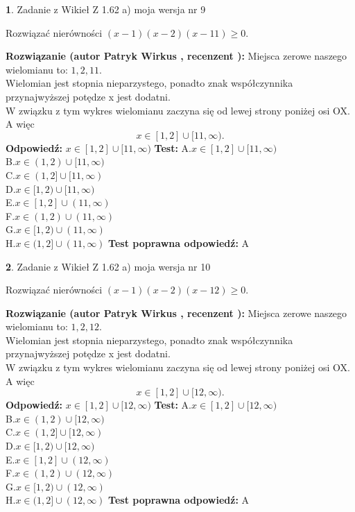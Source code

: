 \documentclass[12pt, a4paper]{article}
\theoremstyle{definition} %
\newtheorem{zad}{}
\newcommand{\zadStart}[1]{\begin{zad}#1\newline}
\newcommand{\zadStop}{\end{zad}}
\newcommand{\rozwStart}[2]{\noindent \textbf{Rozwiązanie (autor #1 , recenzent #2): }\newline}
\newcommand{\rozwStop}{\newline}
\newcommand{\odpStart}{\noindent \textbf{Odpowiedź:}\newline}
\newcommand{\odpStop}{\newline}
\newcommand{\testStart}{\noindent \textbf{Test:}\newline}
\newcommand{\testStop}{\newline}
\newcommand{\kluczStart}{\noindent \textbf{Test poprawna odpowiedź:}\newline}
\newcommand{\kluczStop}{\newline}
\begin{document}
\zadStart{Zadanie z Wikieł Z 1.62 a) moja wersja nr 9}

Rozwiązać nierówności $(x-1)(x-2)(x-11)\ge0$.
\zadStop
\rozwStart{Patryk Wirkus}{}
Miejsca zerowe naszego wielomianu to: $1, 2, 11$.\\
Wielomian jest stopnia nieparzystego, ponadto znak współczynnika przy\linebreak najwyższej potędze x jest dodatni.\\ W związku z tym wykres wielomianu zaczyna się od lewej strony poniżej osi OX. A więc $$x \in [1,2] \cup [11,\infty).$$
\rozwStop
\odpStart
$x \in [1,2] \cup [11,\infty)$
\odpStop
\testStart
A.$x \in [1,2] \cup [11,\infty)$\\
B.$x \in (1,2) \cup [11,\infty)$\\
C.$x \in (1,2] \cup [11,\infty)$\\
D.$x \in [1,2) \cup [11,\infty)$\\
E.$x \in [1,2] \cup (11,\infty)$\\
F.$x \in (1,2) \cup (11,\infty)$\\
G.$x \in [1,2) \cup (11,\infty)$\\
H.$x \in (1,2] \cup (11,\infty)$
\testStop
\kluczStart
A
\kluczStop



\zadStart{Zadanie z Wikieł Z 1.62 a) moja wersja nr 10}

Rozwiązać nierówności $(x-1)(x-2)(x-12)\ge0$.
\zadStop
\rozwStart{Patryk Wirkus}{}
Miejsca zerowe naszego wielomianu to: $1, 2, 12$.\\
Wielomian jest stopnia nieparzystego, ponadto znak współczynnika przy\linebreak najwyższej potędze x jest dodatni.\\ W związku z tym wykres wielomianu zaczyna się od lewej strony poniżej osi OX. A więc $$x \in [1,2] \cup [12,\infty).$$
\rozwStop
\odpStart
$x \in [1,2] \cup [12,\infty)$
\odpStop
\testStart
A.$x \in [1,2] \cup [12,\infty)$\\
B.$x \in (1,2) \cup [12,\infty)$\\
C.$x \in (1,2] \cup [12,\infty)$\\
D.$x \in [1,2) \cup [12,\infty)$\\
E.$x \in [1,2] \cup (12,\infty)$\\
F.$x \in (1,2) \cup (12,\infty)$\\
G.$x \in [1,2) \cup (12,\infty)$\\
H.$x \in (1,2] \cup (12,\infty)$
\testStop
\kluczStart
A
\kluczStop
\end{document}
